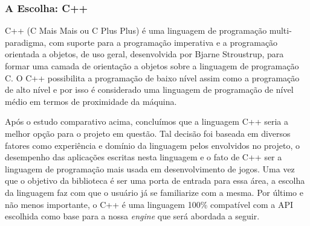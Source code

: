 \subsubsection{A Escolha: C++}
%
C++ (C Mais Mais ou C Plus Plus) \cite{Novatec} é uma linguagem de programação multi-paradigma, com suporte para a programação imperativa e a programação orientada a objetos, de uso geral, desenvolvida por Bjarne Stroustrup, para formar uma camada de orientação a objetos sobre a linguagem de programação C. O C++ possibilita a programação de baixo nível assim como a programação de alto nível e por isso é considerado uma linguagem de programação de nível médio em termos de proximidade da máquina.
\par
Após o estudo comparativo acima, concluímos que a linguagem C++ seria a melhor opção para o projeto em questão. Tal decisão foi baseada em diversos fatores como experiência e domínio da linguagem pelos envolvidos no projeto, o desempenho das aplicações escritas nesta linguagem e o fato de C++ ser a linguagem de programação mais usada em desenvolvimento de jogos. Uma vez que o objetivo da biblioteca é ser uma porta de entrada para essa área, a escolha da linguagem faz com que o usuário já se familiarize com a mesma. Por último e não menos importante, o C++ é uma linguagem 100\% compatível com a API escolhida como base para a nossa \textit{engine} que será abordada a seguir.
%
%
